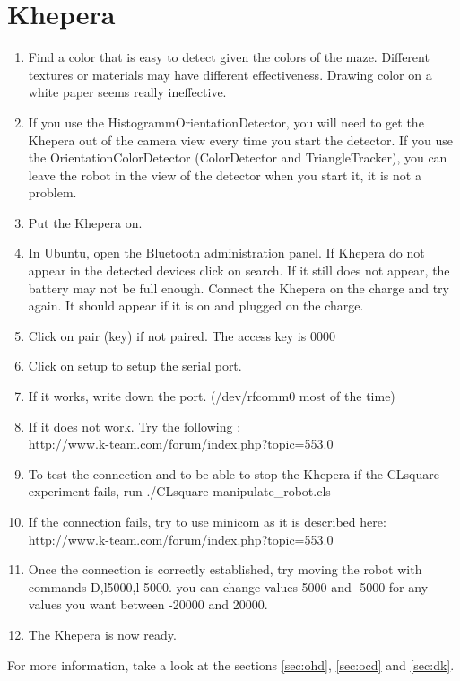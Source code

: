 \section{Khepera}
\label{sec:howto:khepera}

    \begin{enumerate}
        \item Find a color that is easy to detect given the colors of 
            the maze. Different textures or materials may have different 
            effectiveness. Drawing color on a white paper seems really 
            ineffective.
        \item If you use the HistogrammOrientationDetector, you will need 
            to get the Khepera out of the camera view every time you 
            start the detector. If you use the OrientationColorDetector 
            (ColorDetector and TriangleTracker), you can leave the robot 
            in the view of the detector when you start it, it is not a 
            problem.
        \item Put the Khepera on. 
        \item In Ubuntu, open the Bluetooth administration panel. If 
            Khepera do not appear in the detected devices click on 
            search. If it still does not appear, the battery may not be 
            full enough. Connect the Khepera on the charge and try 
            again. It should appear if it is on and plugged on the charge.
        \item Click on pair (key) if not paired. The access key is 0000
        \item Click on setup to setup the serial port.
        \item If it works, write down the port. (/dev/rfcomm0 most of the 
            time)
        \item If it does not work. Try the following : \\
            \url{http://www.k-team.com/forum/index.php?topic=553.0}
        \item To test the connection and to be able to stop the Khepera 
            if the CLsquare experiment fails, run 
                ./CLsquare manipulate\_robot.cls
        \item If the connection fails, try to use minicom as it is 
            described here:  \\
            \url{http://www.k-team.com/forum/index.php?topic=553.0}
        \item Once the connection is correctly established, try moving 
            the robot with commands D,l5000,l-5000. you can change 
            values 5000 and -5000 for any values you want between -20000 
            and 20000. 
        \item The Khepera is now ready.
    \end{enumerate}

For more information, take a look at the sections \ref{sec:ohd}, 
\ref{sec:ocd} and \ref{sec:dk}.

